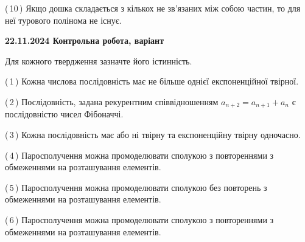 \documentclass[12pt, ukrainian]{article}
\begin{document}
\begin {large}
\begin {large}
\begin {large}
\begin {large}
\begin {large}
\begin {large}
\begin {large}
\begin {large}
\begin {large}
\begin {large}
\begin {large}
\begin {large}
\begin {large}
\begin {large}
\begin {large}
\begin {large}
\begin {large}
\begin {large}
\begin {large}
\begin {large}
\begin {large}
\begin {large}
\begin {large}
\begin {large}
\begin {large}
\begin {large}
\begin {large}
\begin {large}
\begin {large}
\begin {large}
\begin {large}
\begin {large}
\begin {large}
\begin {large}
\begin {large}
\begin {large}
\begin {large}
\begin {large}
\begin {large}
\begin {large}
\begin {large}
\begin {large}
\begin {large}
\begin {large}
\begin {large}
\begin {large}
\begin {large}
\begin {large}
\begin {large}
{(\,10\,) Якщо дошка складається з кількох не зв’язаних між собою частин, то для неї турового полінома не існує.%




\vspace{5mm}
}
\newpage

\begin {large}

\textbf{22.11.2024 Контрольна робота, варіант  }\par


{
Для кожного твердження зазначте його істинність.\par

\vspace{2mm}

(\,1\,) Кожна числова послідовність має не більше однієї  експоненційної твірної.%



(\,2\,) Послідовність, задана рекурентним співвідношенням $a_{n+2}=a_{n+1}+a_{n}$ є послідовністю чисел Фібоначчі.%



(\,3\,) Кожна послідовність має або ні твірну та експоненційну твірну одночасно.%



(\,4\,) Паросполучення можна промоделювати сполукою з повтореннями з обмеженнями на розташування елементів.%



(\,5\,) Паросполучення можна промоделювати сполукою без повторень з обмеженнями на розташування елементів.%



(\,6\,) Паросполучення можна промоделювати сполукою з повтореннями з обмеженнями на розташування елементів.%



}
\end{large}
\end{large}
\end{large}
\end{large}
\end{large}
\end{large}
\end{large}
\end{large}
\end{large}
\end{large}
\end{large}
\end{large}
\end{large}
\end{large}
\end{large}
\end{large}
\end{large}
\end{large}
\end{large}
\end{large}
\end{large}
\end{large}
\end{large}
\end{large}
\end{large}
\end{large}
\end{large}
\end{large}
\end{large}
\end{large}
\end{large}
\end{large}
\end{large}
\end{large}
\end{large}
\end{large}
\end{large}
\end{large}
\end{large}
\end{large}
\end{large}
\end{large}
\end{large}
\end{large}
\end{large}
\end{large}
\end{large}
\end{large}
\end{large}
\end{large}
\end{document}
